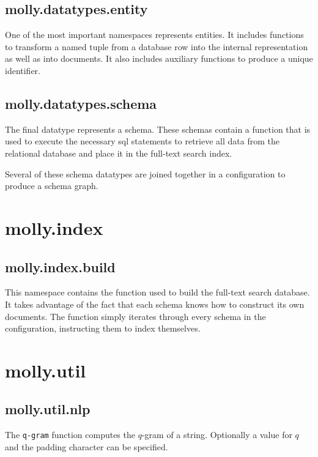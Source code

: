 		
		\clearpage
		\subsection{molly.datatypes.entity}
			One of the most important namespaces represents entities.  It includes functions to transform a named tuple from a database row into the internal representation as well as into documents.  It also includes auxiliary functions to produce a unique identifier.
			
		
		\clearpage
		\subsection{molly.datatypes.schema}
			The final datatype represents a schema.  These schemas contain a function that is used to execute the necessary \gls{sql} statements to retrieve all data from the relational database and place it in the full-text search index.
			
			Several of these schema datatypes are joined together in a configuration to produce a schema graph.
			
	
	\clearpage
	\section{molly.index}
		\subsection{molly.index.build}
			This namespace contains the function used to build the full-text search database.  It takes advantage of the fact that each schema knows how to construct its own documents.  The function simply iterates through every schema in the configuration, instructing them to index themselves.
			
	
	\clearpage
	\section{molly.util}
		\subsection{molly.util.nlp}
			The \texttt{q-gram} function computes the \(q\)-gram of a string.  Optionally a value for \(q\) and the padding character can be specified.
			
